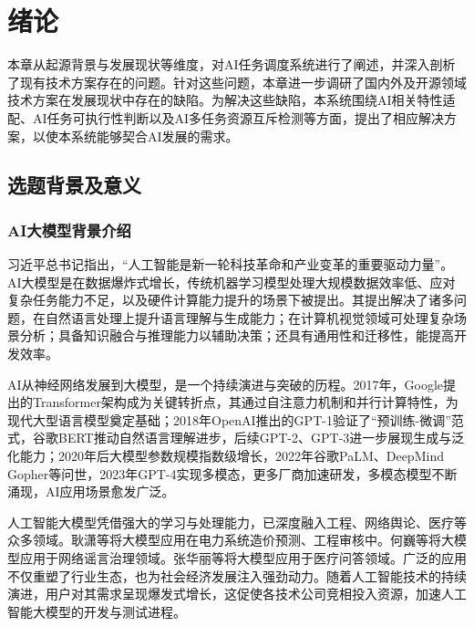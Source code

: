 \chapter{绪论}

本章从起源背景与发展现状等维度，对AI任务调度系统进行了阐述，并深入剖析了现有技术方案存在的问题。针对这些问题，本章进一步调研了国内外及开源领域技术方案在发展现状中存在的缺陷。为解决这些缺陷，本系统围绕AI相关特性适配、AI任务可执行性判断以及AI多任务资源互斥检测等方面，提出了相应解决方案，以使本系统能够契合AI发展的需求。 

\section{选题背景及意义}

\subsection{AI大模型背景介绍}

习近平总书记指出，“人工智能是新一轮科技革命和产业变革的重要驱动力量”\cite{lu2025powermodel}。AI大模型是在数据爆炸式增长，传统机器学习模型处理大规模数据效率低、应对复杂任务能力不足，以及硬件计算能力提升的场景下被提出。其提出解决了诸多问题，在自然语言处理上提升语言理解与生成能力；在计算机视觉领域可处理复杂场景分析；具备知识融合与推理能力以辅助决策；还具有通用性和迁移性，能提高开发效率。 

AI从神经网络发展到大模型，是一个持续演进与突破的历程\cite{subakan2021attention, radford2018improving, devlin2019bert, radford2019language, chowdhery2023palm, rae2021scaling, bubeck2023sparks}。2017年，Google提出的Transformer架构\cite{subakan2021attention}成为关键转折点，其通过自注意力机制和并行计算特性，为现代大型语言模型奠定基础；2018年OpenAI推出的GPT-1验证了“预训练-微调”范式\cite{radford2018improving}，谷歌BERT推动自然语言理解进步\cite{devlin2019bert}，后续GPT-2\cite{radford2019language}、GPT-3进一步展现生成与泛化能力；2020年后大模型参数规模指数级增长，2022年谷歌PaLM\cite{chowdhery2023palm}、DeepMind Gopher\cite{rae2021scaling}等问世，2023年GPT-4\cite{bubeck2023sparks}实现多模态，更多厂商加速研发，多模态模型不断涌现，AI应用场景愈发广泛。

人工智能大模型凭借强大的学习与处理能力，已深度融入工程、网络舆论、医疗等众多领域\cite{geng2025application, he2025framework, zhang2022medical}。耿潇\cite{geng2025application}等将大模型应用在电力系统造价预测、工程审核中。何巍\cite{he2025framework}等将大模型应用于网络谣言治理领域。张华丽\cite{zhang2022medical}等将大模型应用于医疗问答领域。广泛的应用不仅重塑了行业生态，也为社会经济发展注入强劲动力。随着人工智能技术的持续演进，用户对其需求呈现爆发式增长，这促使各技术公司竞相投入资源，加速人工智能大模型的开发与测试进程。

